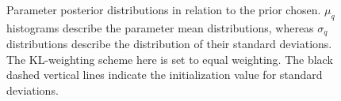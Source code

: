 %
\begin{figure}[H]
	\centering
	
	
	
	
	
	\caption{Parameter posterior distributions in relation to the prior chosen. $\mu_q$ histograms describe the parameter mean distributions, whereas $\sigma_q$ distributions describe the distribution of their standard deviations. The KL-weighting scheme here is set to equal weighting. The black dashed vertical lines indicate the initialization value for standard deviations.}
	\label{fig:bcnn-prior-weights}
\end{figure}
%





